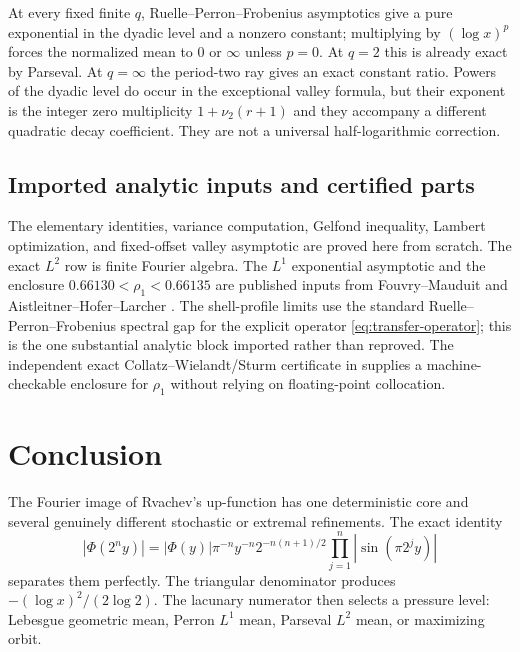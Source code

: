 \documentclass[11pt,oneside]{article}
\theoremstyle{definition}
\theoremstyle{remark}
\newcommand{\Phiup}{\Phi}
\begin{document}
At every fixed finite $q$, Ruelle--Perron--Frobenius asymptotics give a pure exponential in
the dyadic level and a nonzero constant; multiplying by $(\log x)^p$ forces the normalized
mean to $0$ or $\infty$ unless $p=0$.  At $q=2$ this is already exact by Parseval.  At
$q=\infty$ the period-two ray gives an exact constant ratio.  Powers of the dyadic level do
occur in the exceptional valley formula, but their exponent is the integer zero
multiplicity $1+\nu_2(r+1)$ and they accompany a different quadratic decay coefficient.
They are not a universal half-logarithmic correction.

\subsection{Imported analytic inputs and certified parts}

The elementary identities, variance computation, Gelfond inequality, Lambert optimization,
and fixed-offset valley asymptotic are proved here from scratch.  The exact $L^2$ row is
finite Fourier algebra.  The $L^1$ exponential asymptotic and the enclosure
$0.66130<\rho_1<0.66135$ are published inputs from Fouvry--Mauduit and
Aistleitner--Hofer--Larcher \cite{fouvrymauduit1996,ahl2017}.  The shell-profile limits use
the standard Ruelle--Perron--Frobenius spectral gap for the explicit operator
\eqref{eq:transfer-operator}; this is the one substantial analytic block imported rather
than reproved.  The independent exact Collatz--Wielandt/Sturm certificate in
 supplies a machine-checkable enclosure for $\rho_1$ without relying
on floating-point collocation.

\section{Conclusion}
\label{sec:conclusion}

The Fourier image of Rvachev's up-function has one deterministic core and several genuinely
different stochastic or extremal refinements.  The exact identity
\[
 |\Phiup(2^ny)|
 =|\Phiup(y)|\pi^{-n}y^{-n}2^{-n(n+1)/2}
 \prod_{j=1}^n|\sin(\pi2^jy)|
\]
separates them perfectly.  The triangular denominator produces
$-(\log x)^2/(2\log2)$.  The lacunary numerator then selects a pressure level:
Lebesgue geometric mean, Perron $L^1$ mean, Parseval $L^2$ mean, or maximizing orbit.
\end{document}
